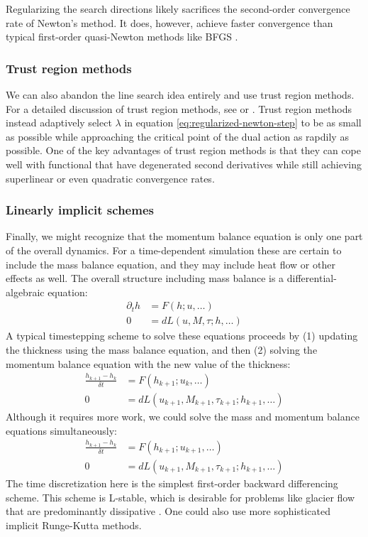 \documentclass[twocolumn,letterpaper]{igs}
\begin{document}
Regularizing the search directions likely sacrifices the second-order convergence rate of Newton's method.
It does, however, achieve faster convergence than typical first-order quasi-Newton methods like BFGS \citep{nocedal2006numerical}.

\subsubsection{Trust region methods}

We can also abandon the line search idea entirely and use trust region methods.
For a detailed discussion of trust region methods, see \citet{nocedal2006numerical} or \citet{conn2000trust}.
Trust region methods instead adaptively select $\lambda$ in equation \eqref{eq:regularized-newton-step} to be as small as possible while approaching the critical point of the dual action as rapdily as possible.
One of the key advantages of trust region methods is that they can cope well with functional that have degenerated second derivatives while still achieving superlinear or even quadratic convergence rates.

\subsubsection{Linearly implicit schemes}
\label{subsec:linearly-implicit-schemes}

Finally, we might recognize that the momentum balance equation is only one part of the overall dynamics.
For a time-dependent simulation these are certain to include the mass balance equation, and they may include heat flow or other effects as well.
The overall structure including mass balance is a differential-algebraic equation:
\begin{align}
    \partial_th & = F(h; u, \ldots) \\
    0 & = dL(u, M, \tau; h, \ldots)
\end{align}
A typical timestepping scheme to solve these equations proceeds by (1) updating the thickness using the mass balance equation, and then (2) solving the momentum balance equation with the new value of the thickness:
\begin{align}
    \frac{h_{k + 1} - h_k}{\delta t} & = F(h_{k + 1}; u_k, \ldots) \\
    0 & = dL(u_{k + 1}, M_{k + 1}, \tau_{k + 1}; h_{k + 1}, \ldots)
\end{align}
Although it requires more work, we could solve the mass and momentum balance equations simultaneously:
\begin{align}
    \frac{h_{k + 1} - h_k}{\delta t} & = F(h_{k + 1}; u_{k + 1}, \ldots) \\
    0 & = dL(u_{k + 1}, M_{k + 1}, \tau_{k + 1}; h_{k + 1}, \ldots)
\end{align}
The time discretization here is the simplest first-order backward differencing scheme.
This scheme is L-stable, which is desirable for problems like glacier flow that are predominantly dissipative \citep{wanner1996solving}.
One could also use more sophisticated implicit Runge-Kutta methods.
\end{document}
